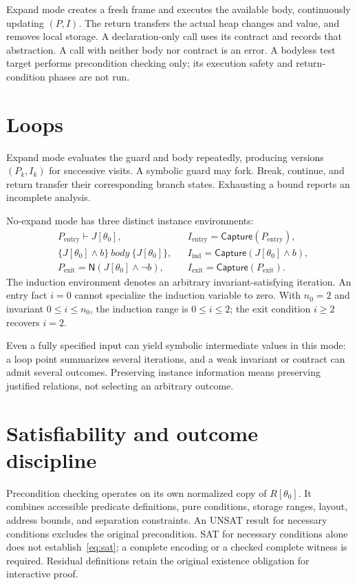 \documentclass[10pt]{article}
\newcommand{\Norm}{\mathsf{N}}
\newcommand{\Capture}{\mathsf{Capture}}
\begin{document}
Expand mode creates a fresh frame and executes the available body, continuously
updating $(P,I)$. The return transfers the actual heap changes and value, and
removes local storage. A declaration-only call uses its contract and records
that abstraction. A call with neither body nor contract is an error. A
bodyless test target performs precondition checking only; its execution safety
and return-condition phases are not run.

\section{Loops}
Expand mode evaluates the guard and body repeatedly, producing versions
$(P_k,I_k)$ for successive visits. A symbolic guard may fork. Break, continue,
and return transfer their corresponding branch states. Exhausting a bound
reports an incomplete analysis.

No-expand mode has three distinct instance environments:
\begin{align*}
 &P_{\mathrm{entry}}\vdash J[\theta_0],
 &&I_{\mathrm{entry}}=\Capture(P_{\mathrm{entry}}),\\
 &\{J[\theta_0]\land b\}\ \mathit{body}\ \{J[\theta_0]\},
 &&I_{\mathrm{ind}}=\Capture(J[\theta_0]\land b),\\
 &P_{\mathrm{exit}}=\Norm(J[\theta_0]\land\neg b),
 &&I_{\mathrm{exit}}=\Capture(P_{\mathrm{exit}}).
\end{align*}
The induction environment denotes an arbitrary invariant-satisfying iteration.
An entry fact $i=0$ cannot specialize the induction variable to zero. With
$n_0=2$ and invariant $0\le i\le n_0$, the induction range is $0\le i\le2$;
the exit condition $i\ge2$ recovers $i=2$.

Even a fully specified input can yield symbolic intermediate values in this
mode: a loop point summarizes several iterations, and a weak invariant or
contract can admit several outcomes. Preserving instance information means
preserving justified relations, not selecting an arbitrary outcome.

\section{Satisfiability and outcome discipline}
Precondition checking operates on its own normalized copy of $R[\theta_0]$.
It combines accessible predicate definitions, pure conditions, storage ranges,
layout, address bounds, and separation constraints. An UNSAT result for
necessary conditions excludes the original precondition. SAT for necessary
conditions alone does not establish~\eqref{eq:sat}; a complete encoding or a
checked complete witness is required. Residual definitions retain the original
existence obligation for interactive proof.
\end{document}
